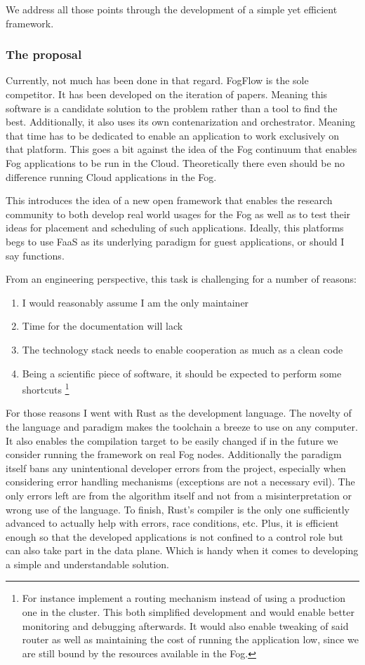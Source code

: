 \documentclass[11pt]{sdm}
\begin{document}
We address all those points through the development of a simple yet efficient framework.

\subsubsection{The proposal}

Currently, not much has been done in that regard. FogFlow is the sole competitor. It has been developed on the iteration of papers. Meaning this software is a candidate solution to the problem rather than a tool to find the best. Additionally, it also uses its own contenarization and orchestrator. Meaning that time has to be dedicated to enable an application to work exclusively on that platform. This goes a bit against the idea of the Fog continuum that enables Fog applications to be run in the Cloud. Theoretically there even should be no difference running Cloud applications in the Fog.

This introduces the idea of a new open framework that enables the research community to both develop real world usages for the Fog as well as to test their ideas for placement and scheduling of such applications. Ideally, this platforms begs to use \gls{FaaS} as its underlying paradigm for guest applications, or should I say functions.

From an engineering perspective, this task is challenging for a number of reasons:
\begin{enumerate}
	\item I would reasonably assume I am the only maintainer
	\item Time for the documentation will lack
	\item The technology stack needs to enable cooperation as much as a clean code
	\item Being a scientific piece of software, it should be expected to perform some shortcuts \footnote{For instance implement a routing mechanism instead of using a production one in the cluster. This both simplified development and would enable better monitoring and debugging afterwards. It would also enable tweaking of said router as well as maintaining the cost of running the application low, since we are still bound by the resources available in the Fog.}
\end{enumerate}

For those reasons I went with Rust as the development language. The novelty of the language and paradigm makes the toolchain a breeze to use on any computer. It also enables the compilation target to be easily changed if in the future we consider running the framework on real Fog nodes. Additionally the paradigm itself bans any unintentional developer errors from the project, especially when considering error handling mechanisms (exceptions are not a necessary evil). The only errors left are from the algorithm itself and not from a misinterpretation or wrong use of the language. To finish, Rust's compiler is the only one sufficiently advanced to actually help with errors, race conditions, etc. Plus, it is efficient enough so that the developed applications is not confined to a control role but can also take part in the data plane. Which is handy when it comes to developing a simple and understandable solution.
\end{document}
